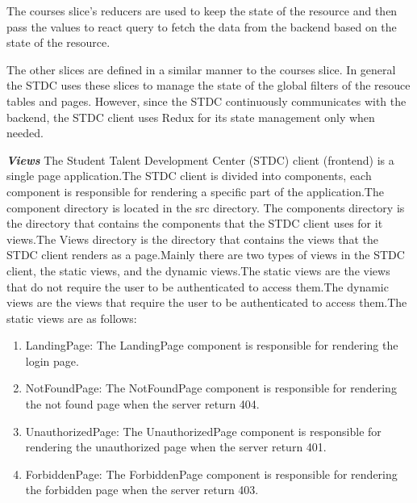 \begin{justify}
        \vspace{0.25cm}
        \newendline The courses slice's reducers are used to keep the state of the resource and then pass the values to react query to fetch the data from the backend based on the state of the resource.

        \vspace{0.25cm}
        \newendline The other slices are defined in a similar manner to the courses slice. In general the STDC uses these slices to manage the state of the global filters of the resouce tables and pages. However, since the STDC continuously communicates with the backend, the STDC client uses Redux for its state management only when needed.

    \clearpage





    \vspace{0.25cm}
    \newendline \textbf{\textit{Views}}\newendline
        The Student Talent Development Center (STDC) client (frontend) is a single page application.The STDC client is divided into components, each component is responsible for rendering a specific part of the application.The component directory is located in the src directory. The components directory is the directory that contains the components that the STDC client uses for it views.The Views directory is the directory that contains the views that the STDC client renders as a page.Mainly there are two types of views in the STDC client, the static views, and the dynamic views.The static views are the views that do not require the user to be authenticated to access them.The dynamic views are the views that require the user to be authenticated to access them.The static views are as follows:

        \begin{enumerate}
            \item LandingPage: The LandingPage component is responsible for rendering the login page.
            \item NotFoundPage: The NotFoundPage component is responsible for rendering the not found page when the server return 404.
            \item UnauthorizedPage: The UnauthorizedPage component is responsible for rendering the unauthorized page when the server return 401.
            \item ForbiddenPage: The ForbiddenPage component is responsible for rendering the forbidden page when the server return 403.
        \end{enumerate}


\end{justify}
